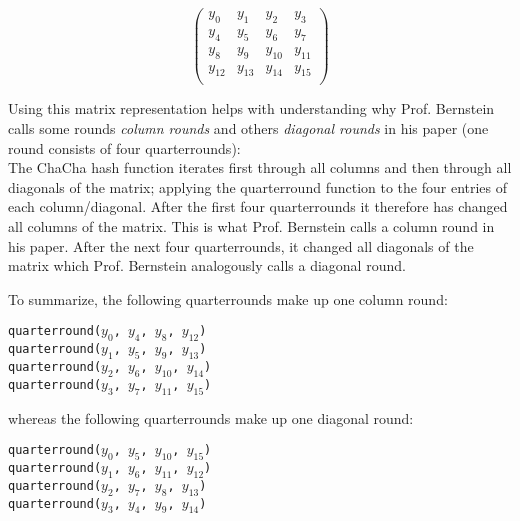 \begin{equation*}
\begin{pmatrix}
y_0 & y_1 & y_2 & y_3 \\
y_4 & y_5 & y_6 & y_7 \\
y_8 & y_9 & y_{10} & y_{11} \\
y_{12} & y_{13} & y_{14} & y_{15}\\
\end{pmatrix}
\end{equation*}

\noindent Using this matrix representation helps with understanding why Prof. Bernstein calls some rounds \textit{column rounds} and others \textit{diagonal rounds} in his paper (one round consists of four quarterrounds): \\
The ChaCha hash function iterates first through all columns and then through all diagonals of the matrix; applying the quarterround function to the four entries of each column/diagonal. After the first four quarterrounds it therefore has changed all columns of the matrix. This is what Prof. Bernstein calls a column round in his paper. After the next four quarterrounds, it changed all diagonals of the matrix which Prof. Bernstein analogously calls a diagonal round.

\noindent To summarize, the following quarterrounds make up one column round:
\begin{center}
\begin{minipage}{0.5\linewidth}
\texttt{quarterround($y_0$, $y_4$, $y_8$, $y_{12}$)} \\
\texttt{quarterround($y_1$, $y_5$, $y_9$, $y_{13}$)} \\
\texttt{quarterround($y_2$, $y_6$, $y_{10}$, $y_{14}$)} \\
\texttt{quarterround($y_3$, $y_7$, $y_{11}$, $y_{15}$)} \\
\end{minipage}
\end{center}
\noindent whereas the following quarterrounds make up one diagonal round:
\begin{center}
\begin{minipage}{0.5\linewidth}
\texttt{quarterround($y_0$, $y_5$, $y_{10}$, $y_{15}$)} \\
\texttt{quarterround($y_1$, $y_6$, $y_{11}$, $y_{12}$)} \\
\texttt{quarterround($y_2$, $y_7$, $y_8$, $y_{13}$)} \\
\texttt{quarterround($y_3$, $y_4$, $y_9$, $y_{14}$)} \\
\end{minipage}
\end{center}

